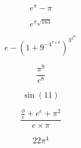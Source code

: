 \documentclass{article}
\begin{document}
    \[
        e^{\pi} - \pi  
    \]

    \[
        e^{\pi\sqrt{163}}  
    \]

    \[
        e - \left(1 + 9^{-4^{7 \times 6}}\right)^{3^{2^{85}}}
    \]

    \[
        \frac{\pi^9}{e^8}  
    \]

    \[
        \sin(11)  
    \]

    \[
        \frac{\frac{\phi}{e} + e^e + \pi^2}{e \times \pi}  
    \]

    \[
        22\pi^4  
    \]
\end{document}
